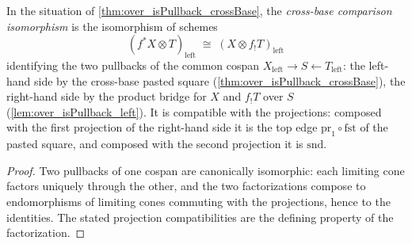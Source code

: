 \begin{definition}
  \label{def:crossBaseIso}
  \leanok
  In the situation of \ref{thm:over_isPullback_crossBase}, the \emph{cross-base
  comparison isomorphism} is the isomorphism of schemes
  \[
    (f^{*}X \otimes T)_{\mathrm{left}} \;\cong\; (X \otimes f_{!}T)_{\mathrm{left}}
  \]
  identifying the two pullbacks of the common cospan
  \(X_{\mathrm{left}} \to S \leftarrow T_{\mathrm{left}}\): the left-hand side by the
  cross-base pasted square (\ref{thm:over_isPullback_crossBase}), the right-hand side
  by the product bridge for \(X\) and \(f_{!}T\) over \(S\)
  (\ref{lem:over_isPullback_left}). It is compatible with the projections: composed
  with the first projection of the right-hand side it is the top edge
  \(\mathrm{pr}_1 \circ \mathrm{fst}\) of the pasted square, and composed with the
  second projection it is \(\mathrm{snd}\).
\end{definition}
\begin{proof}
  \leanok
  Two pullbacks of one cospan are canonically isomorphic: each limiting cone factors
  uniquely through the other, and the two factorizations compose to endomorphisms of
  limiting cones commuting with the projections, hence to the identities. The stated
  projection compatibilities are the defining property of the factorization.
\end{proof}

